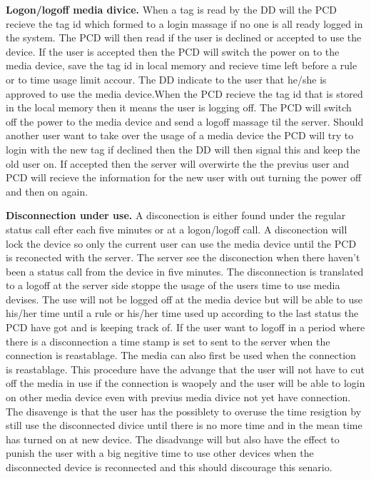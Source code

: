 \textbf{Logon/logoff media divice.} \newline
When a tag is read by the DD will the PCD recieve the tag id which formed to a login massage if no one is all ready logged in the system. The PCD will then read if the user is declined or accepted to use the device. If the user is accepted then the PCD will switch the power on to the media device, save the tag id in local memory and recieve time left before a rule or to time usage limit accour. The DD indicate to the user that he/she is approved to use the media device.\newline When the PCD recieve the tag id that is stored in the local memory then it means the user is logging off. The PCD will switch off the power to the media device and send a logoff massage til the server. Should another user want to take over the usage of a media device the PCD will try to login with the new tag if declined then the DD will then signal this and keep the old user on. If accepted then the server will overwirte the the previus user and PCD will recieve the information for the new user with out turning the power off and then on again.\newline


\textbf{Disconnection under use.} \newline
A disconection is either found under the regular status call efter each five minutes or at a logon/logoff call. A disconection will lock the device so only the current user can use the media device until the PCD is reconected with the server. The server see the disconection when there haven't been a status call from the device in five minutes. The disconnection is translated to a logoff at the server side stoppe the usage of the users time to use media devises. The use will not be logged off at the media device but will be able to use his/her time until a rule or his/her time used up according to the last status the PCD have got and is keeping track of. If the user want to logoff in a period where there is a disconnection a time stamp is set to sent to the server when the connection is reastablage. The media can also first be used when the connection is reastablage.   
This procedure have the advange that the user will not have to cut off the media in use if the connection is waopely and the user will be able to login on other media device even with previus media divice not yet have connection. 
The disavenge is that the user has the possiblety to overuse the time resigtion by still use the disconnected divice until there is no more time and in the mean time has turned on at new device. 
The disadvange will but also have the effect to punish the user with a big negitive time to use other devices when the disconnected device is reconnected and this should discourage this senario.       
    
